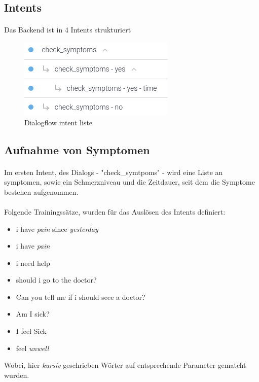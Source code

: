 \documentclass[11pt, letterpaper]{article}
\begin{document}
    \subsection{Intents}
        \paragraph{}
            Das Backend ist in 4 Intents strukturiert
            \begin{figure}[h!]
                \begin{center}
                    \includegraphics[width=0.5\linewidth]{ressources/intents.png}
                \end{center}
                \caption{Dialogflow intent liste}
                \label{fig:intentslist}
            \end{figure}
    \subsection{Aufnahme von Symptomen}
        \paragraph{}
            Im ersten Intent, des Dialogs - "check\_symtpoms" - wird eine Liste an
            symptomen, sowie ein Schmerzniveau und die Zeitdauer, seit dem die Symptome
            bestehen aufgenommen.

        \paragraph{}
            Folgende Trainingssätze, wurden für das Auslösen des Intents definiert:
            \begin{itemize}
                \item i have \emph{pain} since \emph{yesterday}
                \item i have \emph{pain}
                \item i need help
                \item should i go to the doctor?
                \item Can you tell me if i should seee a doctor?
                \item Am I sick?
                \item I feel Sick
                \item feel \emph{unwell}
            \end{itemize}
            Wobei, hier \emph{kursiv} geschrieben Wörter auf entsprechende Parameter gematcht wurden.
\end{document}
